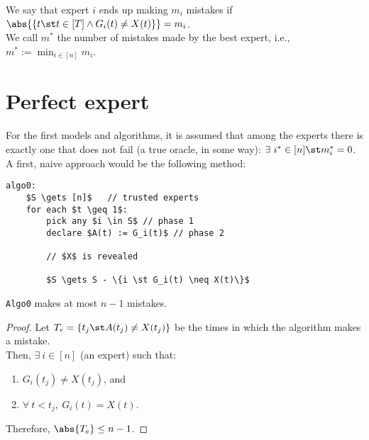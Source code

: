 We say that expert $i$ ends up making $m_i$ mistakes if $\abs{\{ t \st t \in [T] \wedge G_i(t) \neq X(t) \}} = m_i$.\\
We call $m^*$ the number of mistakes made by the best expert, i.e., $m^* := \min_{i \in [n]} m_i$.

\section{Perfect expert}\label{sec:perfect-expert}

For the first models and algorithms, it is assumed that among the experts there is exactly one that does not fail (a true oracle, in some way): $\exists\ i^* \in [n] \st m_i^* = 0$. A first, naive approach would be the following method:

\begin{lstlisting}[caption={Algo 0}, label={lst:exp-algo0}]
algo0:
    $S \gets [n]$   // trusted experts
    for each $t \geq 1$:
        pick any $i \in S$ // phase 1
        declare $A(t) := G_i(t)$ // phase 2

        // $X$ is revealed

        $S \gets S - \{i \st G_i(t) \neq X(t)\}$
\end{lstlisting}


\begin{lem}\label{lem:exp-algo0-errors}
    \texttt{Algo0} makes at most $n - 1$ mistakes.
\end{lem}

\begin{proof}
    Let $T_e = \{t_j \st A(t_j) \neq X(t_j)\}$ be the times in which the algorithm makes a mistake.\\
    Then, $\exists\ i \in [n]$ (an expert) such that:
    \begin{enumerate}
        \item $G_i(t_j) \neq X(t_j)$, and
        \item $\forall\ t < t_j,\ G_i(t) = X(t)$.
    \end{enumerate}
    Therefore, $\abs{T_e} \leq n-1$.
\end{proof}

